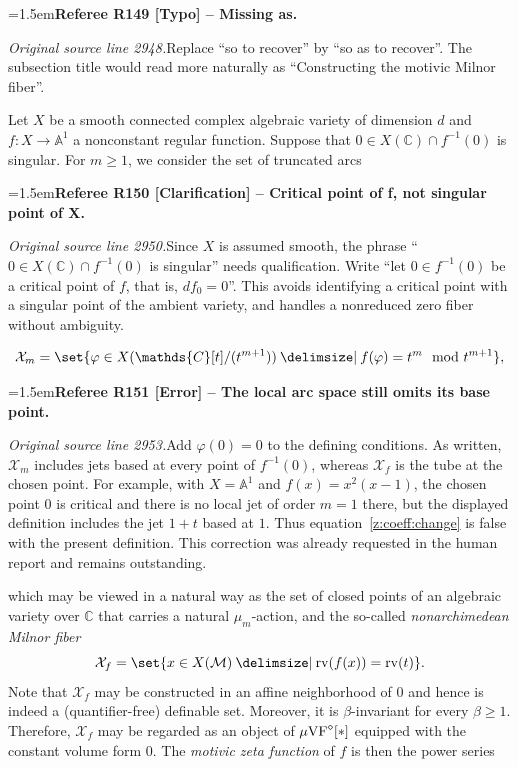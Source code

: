 \documentclass[12pt]{amsart}
\newcommand{\RefereeRemark}[4]{%
  \par\medskip\begingroup\normalfont\small\color{RefereePurple}%
  \emergencystretch=1.5em\noindent\textbf{Referee R#1 [#2] -- #3.}\par\nobreak\noindent #4\par
  \endgroup\medskip
}
\newcommand{\memph}[1]{{\color{magenta}\emph{#1}}}
\theoremstyle{plain}
\theoremstyle{definition}
\theoremstyle{remark}
\numberwithin{equation}{section}
\theoremstyle{plain}
\newcommand{\VF}{\textup{VF}}
\newcommand{\MM}{\mdl M}
\newcommand{\A}{\mathds{A}}
\newcommand{\C}{\mathds{C}}
\newcommand{\0}{\emptyset}
\newcommand{\mdl}[1]{\mathcal{#1}}  %
\newcommand{\fun}{\longrightarrow}
\providecommand\given{}
\newcommand\SetSymbol[1][]{%
\nonscript \: #1 \vert
\allowbreak
\nonscript\:
\mathopen{}}
\renewcommand\given{\SetSymbol[\delimsize]}
\newcommand{\mgVF}{{\mu} {\VF}}
\DeclareMathOperator{\rv}{rv}
\begin{document}
\RefereeRemark{149}{Typo}{Missing as}{%
\textit{Original source line 2948.}\quad Replace ``so to recover'' by ``so as to recover''. The subsection title would read more naturally as ``Constructing the motivic Milnor fiber''. 
}

Let $X$ be a smooth connected complex algebraic variety of dimension $d$ and $f : X \fun \A^1$ a nonconstant regular function. Suppose that $0 \in X(\C) \cap f^{-1}(0)$ is singular. For $m \geq 1$, we consider the set of truncated arcs

\RefereeRemark{150}{Clarification}{Critical point of f, not singular point of X}{%
\textit{Original source line 2950.}\quad Since $X$ is assumed smooth, the phrase ``$0\in X(\C)\cap f^{-1}(0)$ is singular'' needs qualification. Write ``let $0\in f^{-1}(0)$ be a critical point of $f$, that is, $df_0=0$''. This avoids identifying a critical point with a singular point of the ambient variety, and handles a nonreduced zero fiber without ambiguity.
}
\begin{equation}\label{f:m:arc}
\mdl X_{m} = \set{ \varphi \in X(\C[t] / (t^{m+1})) \given f(\varphi) = t^m \mod t^{m+1}},
\end{equation}

\RefereeRemark{151}{Error}{The local arc space still omits its base point}{%
\textit{Original source line 2953.}\quad Add $\varphi(0)=0$ to the defining conditions. As written, $\mdl X_m$ includes jets based at every point of $f^{-1}(0)$, whereas $\mdl X_f$ is the tube at the chosen point. For example, with $X=\A^1$ and $f(x)=x^2(x-1)$, the chosen point $0$ is critical and there is no local jet of order $m=1$ there, but the displayed definition includes the jet $1+t$ based at $1$. Thus equation~\eqref{z:coeff:change} is false with the present definition. This correction was already requested in the human report and remains outstanding.
}
which may be viewed in a natural way as the set of closed points of an algebraic variety over $\C$ that carries a natural $\mu_{m}$-action, and the so-called \memph{nonarchimedean Milnor fiber}
\[
\mdl X_f = \set{ x \in X(\MM) \given \rv(f(x)) = \rv(t)}.
\]
Note that $\mdl X_f$ may be constructed in an affine neighborhood of $0$ and hence is indeed a (quantifier-free) definable set. Moreover, it is $\beta$-invariant for every $\beta \geq 1$. Therefore, $\mdl X_f$ may be regarded as an object of $\mgVF^\diamond[*]$ equipped with the constant volume form $0$. The  \memph{motivic zeta function} of $f$ is then the power series
\end{document}
